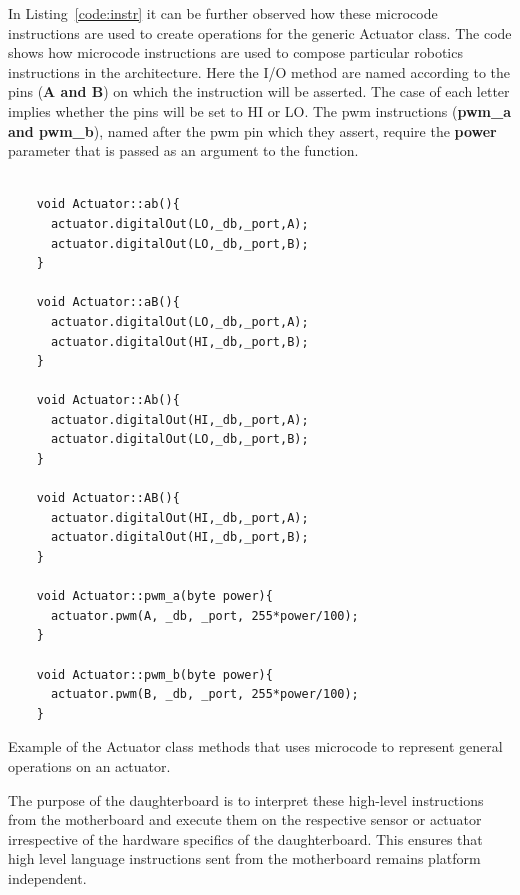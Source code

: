 	In Listing~\ref{code:instr} it can be further observed how these microcode instructions are used to create operations for the generic Actuator class.
The code shows how microcode instructions are used to compose particular robotics instructions in the \xten architecture. Here the I/O method are named according to the pins (\textbf{A and B}) on which the instruction will be asserted. The case of each letter implies whether the pins will be set to HI or LO. The pwm instructions (\textbf{pwm\_a and pwm\_b}), named after the pwm pin which they assert, require the \textbf{power} parameter that is passed as an argument to the function.
	
    \begin{listing}
    \footnotesize
    {\fontsize{8}{6}\selectfont
    \begin{verbatim}

    void Actuator::ab(){
      actuator.digitalOut(LO,_db,_port,A);
      actuator.digitalOut(LO,_db,_port,B);
    }

    void Actuator::aB(){
      actuator.digitalOut(LO,_db,_port,A);
      actuator.digitalOut(HI,_db,_port,B);
    }

    void Actuator::Ab(){
      actuator.digitalOut(HI,_db,_port,A);
      actuator.digitalOut(LO,_db,_port,B);
    }

    void Actuator::AB(){
      actuator.digitalOut(HI,_db,_port,A);
      actuator.digitalOut(HI,_db,_port,B);
    }

    void Actuator::pwm_a(byte power){
      actuator.pwm(A, _db, _port, 255*power/100);
    }

    void Actuator::pwm_b(byte power){
      actuator.pwm(B, _db, _port, 255*power/100);
    }

    \end{verbatim}
    }
    \caption{Example of the Actuator class methods that uses microcode to represent general operations on an actuator.} \label{code:instr}
    \end{listing}
    
	The purpose of the daughterboard is to interpret these high-level instructions from the motherboard and execute them on the respective sensor or actuator irrespective of the hardware specifics of the daughterboard. This ensures that high level language instructions sent from the motherboard remains platform independent.
	
	
	
